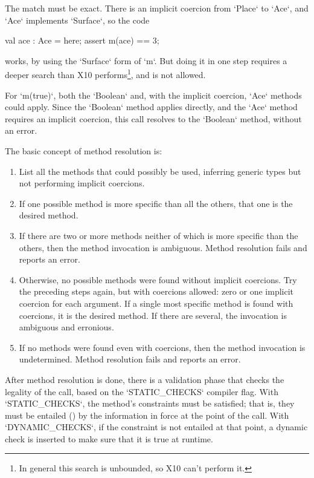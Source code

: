 \begin{ex}
The match must be exact.  There is an implicit coercion 
from \xcd`Place` to \xcd`Ace`, and \xcd`Ace` implements \xcd`Surface`, so the
code
\begin{xten}
val ace : Ace = here;
assert m(ace) == 3;
\end{xten}
works, by using the \xcd`Surface` form of \xcd`m`.  But doing it in one step
requires a deeper search than X10 performs\footnote{In general this search is
unbounded, so X10 can't perform it.}, and is not allowed.


For \xcd`m(true)`, both the \xcd`Boolean` and, with the implicit coercion,
\xcd`Ace` methods could apply.  Since the \xcd`Boolean` method applies
directly, and the \xcd`Ace` method requires an implicit coercion, this call
resolves to the \xcd`Boolean` method, without an error.

\end{ex}


The basic concept of method resolution is:
\begin{enumerate}
\item List all the methods that could possibly be used, inferring generic
      types but not performing implicit coercions.    
\item If one possible method is more specific than all the others, that one 
      is the desired method.
\item If there are two or more methods neither of which is more specific than
      the others, then the method invocation is ambiguous.  Method resolution
      fails and reports an error.
\item Otherwise, no possible methods were found without implicit coercions.
      Try the preceding steps again, but with coercions allowed: zero or one
      implicit coercion for each argument.  If a single
      most specific method is found with coercions, it is the desired method.
      If there are several, the invocation is ambiguous and erronious.
\item If no methods were found even with coercions, then the method invocation
      is undetermined.  Method resolution fails and reports an error.
\end{enumerate}

After method resolution is done, there is a validation phase that checks the
legality of the call, based on the \xcd`STATIC_CHECKS` compiler flag.  
With \xcd`STATIC_CHECKS`, the method's constraints must be satisfied; that is,
they must be entailed () by the information in
force at the point of the call.  With \xcd`DYNAMIC_CHECKS`, if the constraint
is not entailed at that point, a dynamic check is inserted to make sure that
it is true at runtime.

